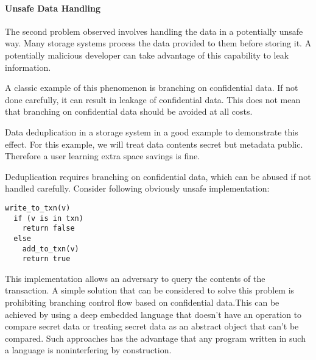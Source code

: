 









\paragraph{Unsafe Data Handling}
The second problem observed involves handling the data in a potentially unsafe way. Many storage systems process the data provided to them before storing it. A potentially malicious developer can take advantage of this capability to leak information.

A classic example of this phenomenon is branching on confidential data. If not done carefully, it can result in leakage of confidential data. This does not mean that branching on confidential data should be avoided at all costs.

Data deduplication in a storage system in a good example to demonstrate this effect. For this example, we will treat data contents secret but metadata public. Therefore a user learning extra space savings is fine.

Deduplication requires branching on confidential data, which can be abused if not handled carefully. Consider following obviously unsafe implementation:

\begin{lstlisting}
write_to_txn(v)
  if (v is in txn)
    return false
  else
    add_to_txn(v)
    return true
\end{lstlisting}

This implementation allows an adversary to query the contents of the transaction. 
A simple solution that can be considered to solve this problem is prohibiting branching control flow based on confidential data.This can be achieved by using a deep embedded language that doesn't have an operation to compare secret data or treating secret data as an abstract object that can't be compared. Such approaches has the advantage 
that any program written in such a language is noninterfering by construction. 

